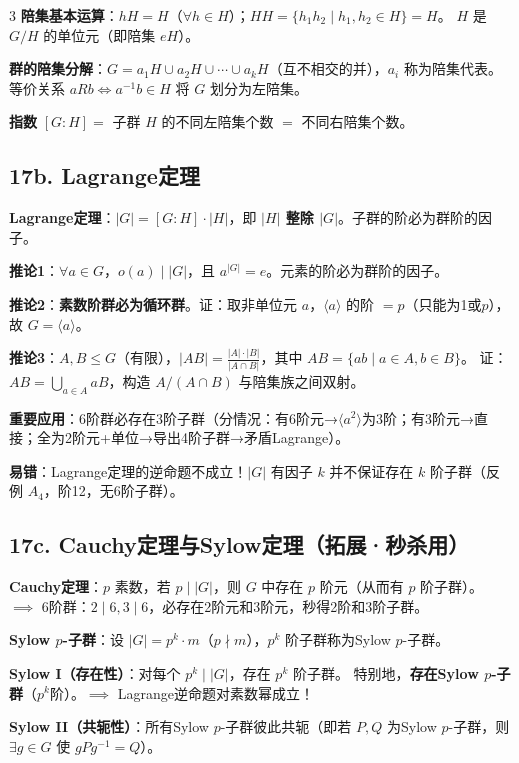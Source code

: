 \documentclass[10pt,a4paper,landscape]{ctexart}
\begin{document}
\begin{multicols}{3}
\textbf{陪集基本运算}：$hH=H$（$\forall h\in H$）；$HH=\{h_1h_2\mid h_1,h_2\in H\}=H$。
$H$ 是 $G/H$ 的单位元（即陪集 $eH$）。

\textbf{群的陪集分解}：$G=a_1H\cup a_2H\cup\cdots\cup a_kH$（互不相交的并），$a_i$ 称为陪集代表。
等价关系 $aRb\iff a^{-1}b\in H$ 将 $G$ 划分为左陪集。

\textbf{指数} $[G:H]=$ 子群 $H$ 的不同左陪集个数 $=$ 不同右陪集个数。

\subsection*{17b. Lagrange定理}

\textbf{Lagrange定理}：$|G|=[G:H]\cdot|H|$，即 \textbf{$|H|$ 整除 $|G|$}。子群的阶必为群阶的因子。

\textbf{推论1}：$\forall a\in G$，$o(a)\mid|G|$，且 $a^{|G|}=e$。元素的阶必为群阶的因子。

\textbf{推论2}：\textbf{素数阶群必为循环群}。证：取非单位元 $a$，$\langle a\rangle$ 的阶 $=p$（只能为1或$p$），故 $G=\langle a\rangle$。

\textbf{推论3}：$A,B\leq G$（有限），$|AB|=\frac{|A|\cdot|B|}{|A\cap B|}$，其中 $AB=\{ab\mid a\in A,b\in B\}$。
证：$AB=\bigcup_{a\in A}aB$，构造 $A/(A\cap B)$ 与陪集族之间双射。

\textbf{重要应用}：6阶群必存在3阶子群（分情况：有6阶元→$\langle a^2\rangle$为3阶；有3阶元→直接；全为2阶元+单位→导出4阶子群→矛盾Lagrange）。

\textbf{易错}：Lagrange定理的逆命题不成立！$|G|$ 有因子 $k$ 并不保证存在 $k$ 阶子群（反例 $A_4$，阶12，无6阶子群）。

\subsection*{17c. Cauchy定理与Sylow定理（拓展·秒杀用）}

\textbf{Cauchy定理}：$p$ 素数，若 $p\mid|G|$，则 $G$ 中存在 $p$ 阶元（从而有 $p$ 阶子群）。
$\implies$ 6阶群：$2\mid 6,3\mid 6$，必存在2阶元和3阶元，秒得2阶和3阶子群。

\textbf{Sylow $p$-子群}：设 $|G|=p^k\cdot m$（$p\nmid m$），$p^k$ 阶子群称为Sylow $p$-子群。

\textbf{Sylow I（存在性）}：对每个 $p^k\mid|G|$，存在 $p^k$ 阶子群。
特别地，\textbf{存在Sylow $p$-子群}（$p^k$阶）。$\implies$ Lagrange逆命题对素数幂成立！

\textbf{Sylow II（共轭性）}：所有Sylow $p$-子群彼此共轭（即若 $P,Q$ 为Sylow $p$-子群，则 $\exists g\in G$ 使 $gPg^{-1}=Q$）。


\end{multicols}
\end{document}
